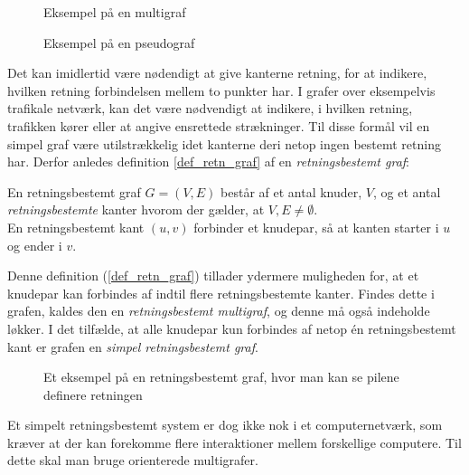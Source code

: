 \begin{figure}[!htb]
   \begin{minipage}{0.48\textwidth}
     \centering
     
     \caption{Eksempel på en multigraf}\label{Fig:Data1}
   \end{minipage}\hfill
   \begin{minipage}{0.48\textwidth}
     \centering
     
     \caption{Eksempel på en pseudograf}\label{Fig:Data2}
   \end{minipage}
\end{figure}


\noindent Det kan imidlertid være nødendigt at give kanterne retning, for at indikere, hvilken retning forbindelsen mellem to punkter har. I grafer over eksempelvis trafikale netværk, kan det være nødvendigt at indikere, i hvilken retning, trafikken kører eller at angive ensrettede strækninger. Til disse formål vil en simpel graf være utilstrækkelig idet kanterne deri netop ingen bestemt retning har. Derfor anledes definition \ref{def_retn_graf} 
af en \textit{retningsbestemt graf}:

\begin{defn}
En retningsbestemt graf $G = (V, E)$ består af et antal knuder, $V$, og et antal \textit{retningsbestemte} kanter hvorom der gælder, at $V, E \neq \emptyset$.\\
En retningsbestemt kant $(u,v)$ forbinder et knudepar, så at kanten starter i $u$ og ender i $v$.
\label{def_retn_graf}
\end{defn} 

\noindent Denne definition (\ref{def_retn_graf}) tillader ydermere muligheden for, at et knudepar kan forbindes af indtil flere retningsbestemte kanter. Findes dette i grafen, kaldes den en \textit{retningsbestemt multigraf}, og denne må også indeholde løkker. I det tilfælde, at alle knudepar kun forbindes af netop én retningsbestemt kant er grafen en \textit{simpel retningsbestemt graf}.

\begin{figure}[h]
\centering
\caption{Et eksempel på en retningsbestemt graf, hvor man kan se pilene definere retningen}
\end{figure}
\noindent Et simpelt retningsbestemt system er dog ikke nok i et computernetværk, som kræver at der kan forekomme flere interaktioner mellem forskellige computere. Til dette skal man bruge orienterede multigrafer.


